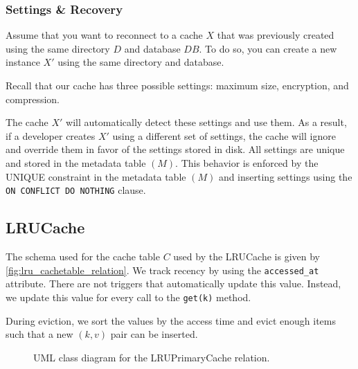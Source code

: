 \subsubsection{Settings \& Recovery}
Assume that you want to reconnect to a cache $X$ that was previously
created using the same directory $D$ and database $DB$. To do so, you can
create a new instance $X'$ using the same directory and database.

Recall that our cache has three possible settings: maximum size, encryption, and compression.

The cache $X'$ will automatically detect these settings and use them. As a result,
if a developer creates $X'$ using a different set of settings, the cache will
ignore and override them in favor of the settings stored in disk.
All settings are unique and stored
in the metadata table $(M)$. This behavior is enforced by the UNIQUE
constraint in the metadata table $(M)$ and inserting
settings using the \texttt{ON CONFLICT DO NOTHING} clause.

\subsection{LRUCache\label{sec:lru}}
The schema used for the cache table $C$ used by the LRUCache
is given by \autoref{fig:lru_cachetable_relation}. We track
recency by using the \texttt{accessed\_at} attribute. There
are not triggers that automatically update this value. Instead,
we update this value for every call to the \texttt{get(k)}
method.

During eviction, we sort the values
by the access time and evict enough items
such that a new $(k, v)$ pair can be inserted.

\begin{figure}[!htp]
    \centering
    \caption{UML class diagram for the LRUPrimaryCache relation.}
    \label{fig:lru_cachetable_relation}
\end{figure}

